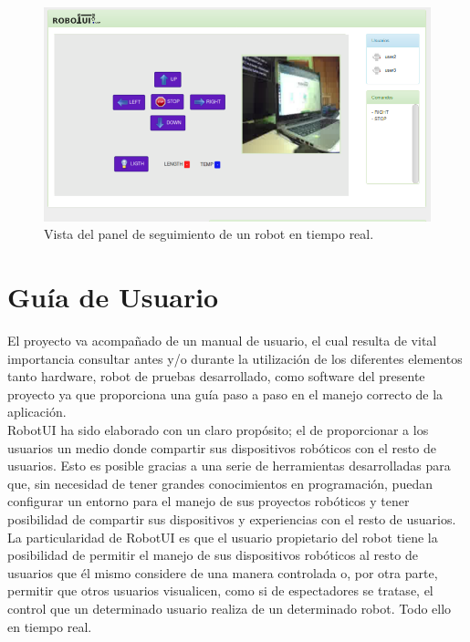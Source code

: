 \documentclass[a4paper,12pt]{article}
\begin{document}
\begin{figure}[H]
  \begin{center}
    \includegraphics[scale=.45]{imagenes/vista_seguimiento.png}
  \end{center}
  \caption{ Vista del panel de seguimiento de un robot en tiempo real.}
  \label{website:ventana-seguimiento}
\end{figure}


\section{ Guía de Usuario}

El proyecto va acompañado de un manual de usuario, el cual resulta de vital importancia consultar antes y/o durante la utilización de los diferentes elementos tanto hardware, robot de pruebas desarrollado, como software del 
presente proyecto ya que proporciona una guía paso a paso en el manejo correcto de la aplicación.\\

RobotUI ha sido elaborado con un claro propósito; el de  proporcionar a los usuarios un medio donde compartir sus dispositivos robóticos con el resto de usuarios. Esto es posible gracias a una serie de
herramientas desarrolladas para que, sin necesidad de tener grandes conocimientos en programación, puedan configurar un entorno para el manejo de sus proyectos robóticos y tener 
posibilidad de compartir sus dispositivos y experiencias con el resto de usuarios.\\

La particularidad de RobotUI es que el usuario propietario del robot tiene la posibilidad de permitir el manejo de sus dispositivos robóticos al resto de usuarios que él mismo considere de una 
manera controlada o, por otra parte, permitir que otros usuarios visualicen, como si de espectadores se tratase, el control que un determinado usuario realiza de un determinado robot.
Todo ello en tiempo real.\\
\end{document}
